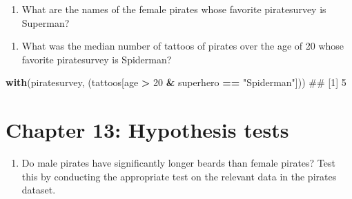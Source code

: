 \documentclass[]{book}
\newenvironment{Shaded}{\begin{snugshade}}{\end{snugshade}}
\newcommand{\KeywordTok}[1]{\textcolor[rgb]{0.13,0.29,0.53}{\textbf{#1}}}
\newcommand{\DecValTok}[1]{\textcolor[rgb]{0.00,0.00,0.81}{#1}}
\newcommand{\StringTok}[1]{\textcolor[rgb]{0.31,0.60,0.02}{#1}}
\newcommand{\OperatorTok}[1]{\textcolor[rgb]{0.81,0.36,0.00}{\textbf{#1}}}
\newcommand{\NormalTok}[1]{#1}
\providecommand{\tightlist}{%
  \setlength{\itemsep}{0pt}\setlength{\parskip}{0pt}}
\theoremstyle{definition}
\theoremstyle{definition}
\theoremstyle{remark}
\begin{document}
\begin{Shaded}
\end{Shaded}

\begin{enumerate}
\def\labelenumi{\arabic{enumi}.}
\setcounter{enumi}{8}
\tightlist
\item
  What are the names of the female pirates whose favorite piratesurvey
  is Superman?
\end{enumerate}

\begin{Shaded}
\end{Shaded}

\begin{enumerate}
\def\labelenumi{\arabic{enumi}.}
\setcounter{enumi}{9}
\tightlist
\item
  What was the median number of tattoos of pirates over the age of 20
  whose favorite piratesurvey is Spiderman?
\end{enumerate}

\begin{Shaded}
\begin{Highlighting}[]
\KeywordTok{with}\NormalTok{(piratesurvey, (tattoos[age }\OperatorTok{>}\StringTok{ }\DecValTok{20} \OperatorTok{&}\StringTok{ }\NormalTok{superhero }\OperatorTok{==}\StringTok{ "Spiderman"}\NormalTok{]))}
\NormalTok{## [1] 5}
\end{Highlighting}
\end{Shaded}

\section{Chapter 13: Hypothesis
tests}\label{chapter-13-hypothesis-tests}

\begin{enumerate}
\def\labelenumi{\arabic{enumi}.}
\tightlist
\item
  Do male pirates have significantly longer beards than female pirates?
  Test this by conducting the appropriate test on the relevant data in
  the pirates dataset.
\end{enumerate}
\end{document}
